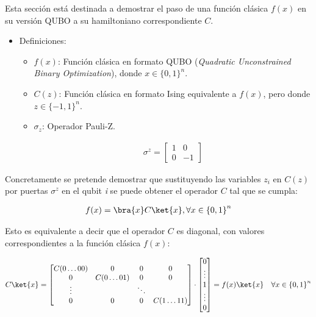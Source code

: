 Esta sección está destinada a demostrar el paso de una función clásica $f(x)$ en su versión QUBO a su hamiltoniano correspondiente $C$.

\begin{itemize}
\item Definiciones:
  \begin{itemize}
  \item $f(x)$: Función clásica en formato QUBO (\textit{Quadratic Unconstrained Binary Optimization}), donde $x \in {\{0 , 1\}}^n$.

  \item $C(z)$: Función clásica en formato Ising equivalente a $f(x)$, pero donde $z \in {\{-1 , 1\}}^n$.

  \item $\sigma_z$: Operador Pauli-Z.

    \begin{align*}
      \sigma^z = \begin{bmatrix}
        1 & 0 \\
        0 & -1
      \end{bmatrix}
    \end{align*}
  \end{itemize}
\end{itemize}

Concretamente se pretende demostrar que sustituyendo las variables $z_i$ en $C(z)$ por puertas $\sigma^z$ en el qubit \textit{i} se puede obtener el operador $C$ tal que se cumpla:

\begin{align*}
  f(x) = \bra{x} C \ket{x}, \forall{x \in {\{0, 1\}}^n}
\end{align*}

Esto es equivalente a decir que el operador $C$ es diagonal, con valores correspondientes a la función clásica $f(x)$:

\begin{align*}
  &C \ket{x} = \begin{bmatrix}
    C(0 \ldots 00) & 0          & 0  & 0 \\
    0          & C(0 \ldots 01) & 0  & 0 \\
    \vdots         &            & \ddots &   \\
    0          & 0          & 0  & C(1 \ldots 11)
  \end{bmatrix} \cdot
  \begin{bmatrix}
    0  \\
    \vdots \\
    1  \\
    \vdots \\
    0
  \end{bmatrix} = f(x) \ket{x} & \forall x \in {\{0, 1\}}^n
\end{align*}

